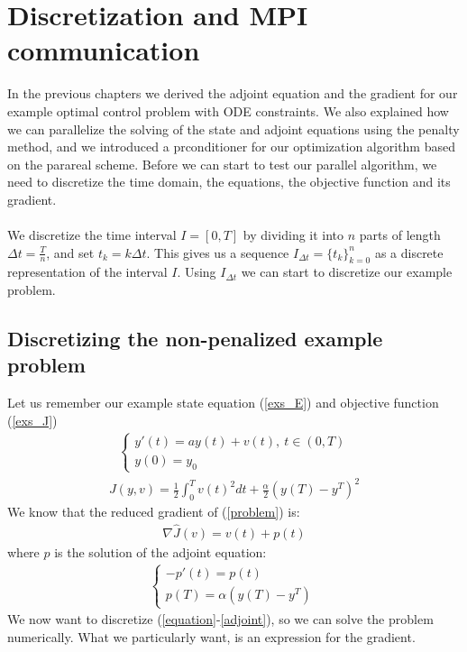 \chapter{Discretization and MPI communication} \label{disc_chap}
In the previous chapters we derived the adjoint equation and the gradient for our example optimal control problem with ODE constraints. We also explained how we can parallelize the solving of the state and adjoint equations using the penalty method, and we introduced a prconditioner for our optimization algorithm based on the parareal scheme. Before we can start to test our parallel algorithm, we need to discretize the time domain, the equations, the objective function and its gradient. 
\\
\\
We discretize the time interval $I=[0,T]$ by dividing it into $n$ parts of length $\Delta t=\frac{T}{n}$, and set $t_k=k\Delta t$. This gives us a sequence $I_{\Delta t}=\{t_k\}_{k=0}^{n}$ as a discrete representation of the interval $I$. Using $I_{\Delta t}$ we can start to discretize our example problem.
\section{Discretizing the non-penalized example problem}
Let us remember our example state equation (\ref{exs_E}) and objective function (\ref{exs_J}) 
\begin{align}
\left\{
     \begin{array}{lr}
       	y'(t)=a y(t) +v(t), \ t \in (0,T)\\
       	   y(0)=y_0
     \end{array}
   \right. \label{equation}
\end{align}
\begin{align}
J(y,v) = \frac{1}{2}\int_0^Tv(t)^2dt + \frac{\alpha}{2}(y(T)-y^T)^2
\label{problem}
\end{align}
We know that the reduced gradient of (\ref{problem}) is:
\begin{align}
\nabla\hat{J}(v) = v(t)+p(t) \label{gradiant}
\end{align}
where $p$ is the solution of the adjoint equation:
\begin{align}   
  \left\{
     \begin{array}{lr}
	-p'(t) = p(t) \\
	p(T) = \alpha( y(T)-y^T)     \
	\end{array}
   \right. \label{adjoint}
\end{align}
We now want to discretize (\ref{equation}-\ref{adjoint}), so we can solve the problem numerically. What we particularly want, is an expression for the gradient. 
